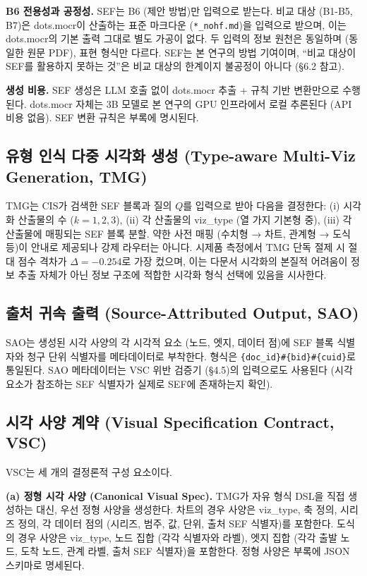 \documentclass[11pt]{article}
\begin{document}
\textbf{B6 전용성과 공정성.} SEF는 B6 (제안 방법)만 입력으로 받는다. 비교 대상 (B1-B5, B7)은 dots.mocr이 산출하는 표준 마크다운 (\texttt{*\_nohf.md})을 입력으로 받으며, 이는 dots.mocr의 기본 출력 그대로 별도 가공이 없다. 두 입력의 정보 원천은 동일하며 (동일한 원문 PDF), 표현 형식만 다르다. SEF는 본 연구의 방법 기여이며, ``비교 대상이 SEF를 활용하지 못하는 것''은 비교 대상의 한계이지 불공정이 아니다 (\S 6.2 참고).

\textbf{생성 비용.} SEF 생성은 LLM 호출 없이 dots.mocr 추출 + 규칙 기반 변환만으로 수행된다. dots.mocr 자체는 3B 모델로 본 연구의 GPU 인프라에서 로컬 추론된다 (API 비용 없음). SEF 변환 규칙은 부록에 명시된다.

\subsection{유형 인식 다중 시각화 생성 (Type-aware Multi-Viz Generation, TMG)}

TMG는 CIS가 검색한 SEF 블록과 질의 $Q$를 입력으로 받아 다음을 결정한다: (i) 시각화 산출물의 수 ($k=1, 2, 3$), (ii) 각 산출물의 viz\_type (열 가지 기본형 중), (iii) 각 산출물에 매핑되는 SEF 블록 분할. 약한 사전 매핑 (수치형 → 차트, 관계형 → 도식 등)이 안내로 제공되나 강제 라우터는 아니다. 시제품 측정에서 TMG 단독 절제 시 절대 점수 격차가 $\Delta=-0.254$로 가장 컸으며, 이는 다문서 시각화의 본질적 어려움이 정보 추출 자체가 아닌 정보 구조에 적합한 시각화 형식 선택에 있음을 시사한다.

\subsection{출처 귀속 출력 (Source-Attributed Output, SAO)}

SAO는 생성된 시각 사양의 각 시각적 요소 (노드, 엣지, 데이터 점)에 SEF 블록 식별자와 청구 단위 식별자를 메타데이터로 부착한다. 형식은 \texttt{\{doc\_id\}\#\{bid\}\#\{cuid\}}로 통일된다. SAO 메타데이터는 VSC 위반 검증기 (\S 4.5)의 입력으로도 사용된다 (시각 요소가 참조하는 SEF 식별자가 실제로 SEF에 존재하는지 확인).

\subsection{시각 사양 계약 (Visual Specification Contract, VSC)}
\label{sec:vsc}

VSC는 세 개의 결정론적 구성 요소이다.

\textbf{(a) 정형 시각 사양 (Canonical Visual Spec).} TMG가 자유 형식 DSL을 직접 생성하는 대신, 우선 정형 사양을 생성한다. 차트의 경우 사양은 viz\_type, 축 정의, 시리즈 정의, 각 데이터 점의 (시리즈, 범주, 값, 단위, 출처 SEF 식별자)를 포함한다. 도식의 경우 사양은 viz\_type, 노드 집합 (각각 식별자와 라벨), 엣지 집합 (각각 출발 노드, 도착 노드, 관계 라벨, 출처 SEF 식별자)을 포함한다. 정형 사양은 부록에 JSON 스키마로 명세된다.
\end{document}
